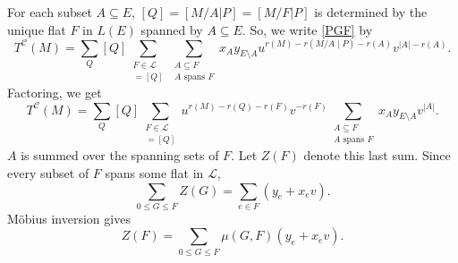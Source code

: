 \documentclass[12pt,leqno]{amsart}
\theoremstyle{remark}
\begin{document}
For each subset $A\subseteq E$, 
$[Q] = [M/A|P] = [M/F|P]$ is determined by the unique flat $F$
in $L(E)$ spanned by $A\subseteq E$.  So, we write \eqref{PGF}
by
\[
T^{\mathcal{C}}(M) = 
     \sum_{Q} [Q] \sum_{\substack{
                     F\in \mathcal{L}\\
                     [M/F|P]=[Q]
                      }}
      \sum_{\substack{
             A\subseteq F\\
             A\text{ spans }F
          }}
      x_A y_{E\setminus A}
      u^{r(M)-r(M/A\mid P)-r(A)}
      v^{|A|-r(A)}.
\]
Factoring, we get
\[
T^{\mathcal{C}}(M) = 
     \sum_{Q} [Q] \sum_{\substack{
                     F\in \mathcal{L}\\
                     [M/F|P]=[Q]
                      }}
      u^{r(M)-r(Q)-r(F)}
      v^{-r(F)}
      \sum_{\substack{
             A\subseteq F\\
             A\text{ spans }F
          }}
      x_A y_{E\setminus A}
      v^{|A|}.
\]
$A$ is summed over the spanning sets of $F$.  Let $Z(F)$ denote
this last sum.  Since every subset of $F$ spans some flat
in $\mathcal{L}$,
\[
\sum_{0\le G \le F}Z(G) = \sum_{e\in F}(y_e + x_ev).
\]
M\"{o}bius inversion gives
\[
Z(F)= \sum_{0\le G\le F}\mu(G,F)(y_e +  x_ev).
\]
\end{document}
